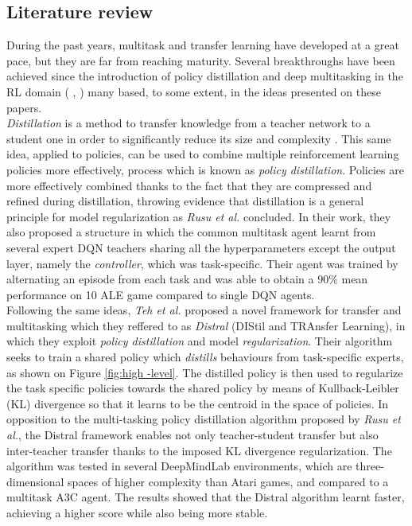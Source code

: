 \documentclass{article}
\begin{document}
\subsection{Literature review}
During the past years, multitask and transfer learning have developed at a great pace, but they are far from reaching maturity. Several breakthroughs have been achieved since the introduction of policy distillation and deep multitasking in the RL domain ( \citep{RusuPOLICYDISTILLATION}, \citep{Parisotto2015Actor-Mimic:Learning})  many based, to some extent, in the ideas presented on these papers.\\
\newline
\textit{Distillation} is a method to transfer knowledge from a teacher network to a student one in order to significantly reduce its size and complexity \citep{RusuPOLICYDISTILLATION}. This same idea, applied to policies, can be used to combine multiple reinforcement learning policies more effectively, process which is known as \textit{policy distillation}. Policies are more effectively combined thanks to the fact that they are compressed and refined during distillation, throwing evidence that distillation is a general principle for model regularization as \textit{Rusu et al.} concluded. In their work, they also proposed a structure in which the common multitask agent learnt from several expert DQN teachers sharing all the hyperparameters except the output layer, namely the \textit{controller}, which was task-specific. Their agent was trained by alternating an episode from each task and was able to obtain a $90\%$ mean performance on 10 ALE game compared to single DQN agents.\\
\newline
Following the same ideas, \textit{Teh et al.} \citep{Teh2017Distral:Learning} proposed a novel framework for transfer and multitasking which they reffered to as \textit{Distral} (DIStil and TRAnsfer Learning), in which they exploit \textit{policy distillation} and model \textit{regularization}. Their algorithm seeks to train a shared policy which \textit{distills} behaviours from task-specific experts, as shown on Figure \ref{fig:high -level}. The distilled policy is then used to regularize the task specific policies towards the shared policy by means of Kullback-Leibler (KL) divergence so that it learns to be the centroid in the space of policies. In opposition to the multi-tasking policy distillation algorithm proposed by \textit{Rusu et al.}, the Distral framework enables not only teacher-student transfer but also inter-teacher transfer thanks to the imposed KL divergence regularization. The algorithm was tested in several DeepMindLab environments, which are three-dimensional spaces of higher complexity than Atari games, and compared to a multitask A3C agent. The results showed that the Distral algorithm learnt faster, achieving a higher score while also being more stable.\\
\end{document}
